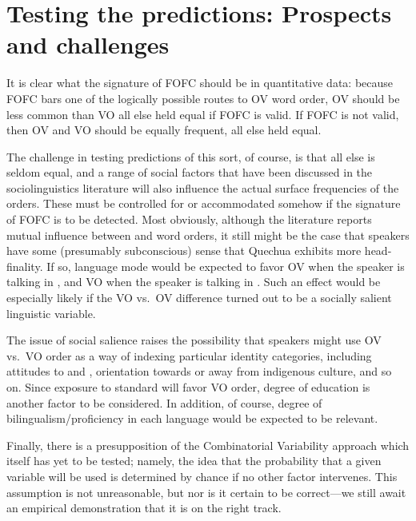 \documentclass[output=paper]{langsci/langscibook}
\begin{document}
\section{Testing the predictions: Prospects and challenges}\label{sec-30:key:3}

It is clear what the signature of \gls{FOFC} should be in quantitative data: because
FOFC bars one of the logically possible routes to OV word order, OV should be
less common than VO all else held equal if \gls{FOFC} is valid.  If \gls{FOFC} is not
valid, then OV and VO should be equally frequent, all else held equal.

The challenge in testing predictions of this sort, of course, is that all else
is seldom equal, and a range of social factors that have been discussed in the
sociolinguistics literature will also influence the actual surface frequencies
of the orders.  These must be controlled for or accommodated somehow if the
signature of \gls{FOFC} is to be detected.  Most obviously, although the literature
reports mutual influence between  and  word orders, it still
might be the case that speakers have some (presumably subconscious) sense that
Quechua exhibits more head-finality. If so, language mode would be expected to
favor OV when the speaker is talking in , and VO when the speaker is
talking in .  Such an effect would be especially likely if the VO vs.\ OV
difference turned out to be a socially salient linguistic variable.

The issue of social salience raises the possibility that speakers might use OV
vs.\ VO order as a way of indexing particular identity categories, including
attitudes to  and , orientation towards or away from indigenous
culture, and so on.  Since exposure to standard  will favor VO order,
degree of education is another factor to be considered. In addition, of course,
degree of bilingualism/proficiency in each language would be expected to be
relevant.

Finally, there is a presupposition of the Combinatorial Variability approach
which itself has yet to be tested;  namely, the idea that the probability that
a given variable will be used is determined by chance if no other factor
intervenes.  This assumption is not unreasonable, but nor is it certain to be
correct—we still await an empirical demonstration that it is on the right
track.
\end{document}
